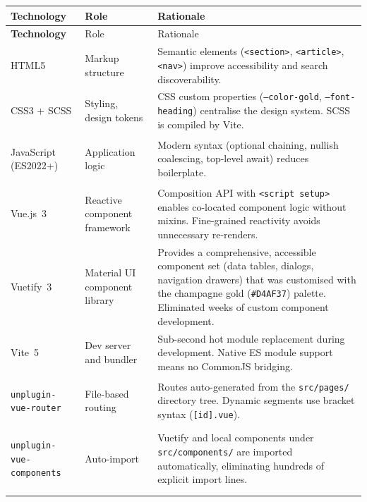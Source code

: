 \documentclass[12pt,a4paper,oneside]{report}
\begin{document}
\begin{longtable}{>{\bfseries}L{3.8cm} L{3.2cm} L{5.5cm}}
  \toprule
  Technology & Role & Rationale \\
  \midrule
  \endfirsthead
  \toprule
  Technology & Role & Rationale \\
  \midrule
  \endhead
  \bottomrule
  \endlastfoot

  HTML5 &
    Markup structure &
    Semantic elements (\texttt{<section>}, \texttt{<article>}, \texttt{<nav>})
    improve accessibility and search discoverability. \\
  \addlinespace

  CSS3 + SCSS &
    Styling, design tokens &
    CSS custom properties (\texttt{--color-gold}, \texttt{--font-heading})
    centralise the design system. SCSS is compiled by Vite. \\
  \addlinespace

  JavaScript (ES2022+) &
    Application logic &
    Modern syntax (optional chaining, nullish coalescing, top-level await)
    reduces boilerplate. \\
  \addlinespace

  Vue.js~3 &
    Reactive component framework &
    Composition API with \texttt{<script setup>} enables co-located
    component logic without mixins. Fine-grained reactivity avoids
    unnecessary re-renders. \\
  \addlinespace

  Vuetify~3 &
    Material UI component library &
    Provides a comprehensive, accessible component set (data tables,
    dialogs, navigation drawers) that was customised with the champagne
    gold (\texttt{\#D4AF37}) palette. Eliminated weeks of custom component
    development. \\
  \addlinespace

  Vite~5 &
    Dev server and bundler &
    Sub-second hot module replacement during development. Native ES module
    support means no CommonJS bridging. \\
  \addlinespace

  \texttt{unplugin-}\newline\texttt{vue-router} &
    File-based routing &
    Routes auto-generated from the \texttt{src/pages/} directory tree.
    Dynamic segments use bracket syntax (\texttt{[id].vue}). \\
  \addlinespace

  \texttt{unplugin-}\newline\texttt{vue-components} &
    Auto-import &
    Vuetify and local components under \texttt{src/components/} are
    imported automatically, eliminating hundreds of explicit import lines. \\
  \addlinespace


\end{longtable}
\end{document}
